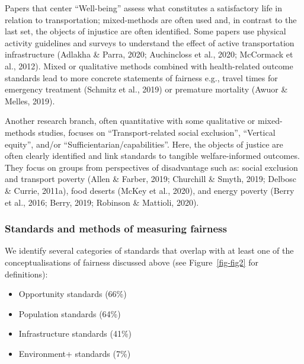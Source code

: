 \documentclass[
  letterpaper,
  DIV=11,
  numbers=noendperiod]{scrartcl}
\begin{document}
Papers that center ``Well-being'' assess what constitutes a satisfactory
life in relation to transportation; mixed-methods are often used and, in
contrast to the last set, the objects of injustice are often identified.
Some papers use physical activity guidelines and surveys to understand
the effect of active transportation infrastructure (Adlakha \& Parra,
2020; Auchincloss et al., 2020; McCormack et al., 2012). Mixed or
qualitative methods combined with health-related outcome standards lead
to more concrete statements of fairness e.g., travel times for emergency
treatment (Schmitz et al., 2019) or premature mortality (Awuor \&
Melles, 2019).

Another research branch, often quantitative with some qualitative or
mixed-methods studies, focuses on ``Transport-related social
exclusion'', ``Vertical equity'', and/or
``Sufficientarian/capabilities''. Here, the objects of justice are often
clearly identified and link standards to tangible welfare-informed
outcomes. They focus on groups from perspectives of disadvantage such
as: social exclusion and transport poverty (Allen \& Farber, 2019;
Churchill \& Smyth, 2019; Delbosc \& Currie, 2011a), food deserts (McKey
et al., 2020), and energy poverty (Berry et al., 2016; Berry, 2019;
Robinson \& Mattioli, 2020).

\subsubsection{Standards and methods of measuring
fairness}\label{standards-and-methods-of-measuring-fairness}

We identify several categories of standards that overlap with at least
one of the conceptualisations of fairness discussed above (see
Figure~\ref{fig-fig2} for definitions):

\begin{itemize}
\item
  Opportunity standards (66\%)
\item
  Population standards (64\%)
\item
  Infrastructure standards (41\%)
\item
  Environment+ standards (7\%)
\end{itemize}
\end{document}
